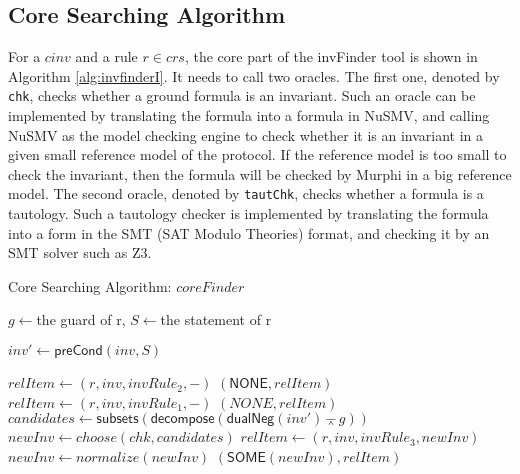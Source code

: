 \documentclass[conference]{IEEEtran}
\def \andc {\barwedge }
\begin{document}
{\subsection{Core Searching Algorithm}\label{sec:coresearchingAlgorithm}
\vspace{-5pt}
For a  $cinv$ and a rule $r \in crs$, the core part of the {\sf invFinder} tool is shown in Algorithm \ref{alg:invfinderI}. It needs to call two oracles. The first one, denoted by {\tt chk}, checks whether a ground formula is an invariant. Such an oracle can be implemented by translating the formula into a formula in NuSMV, and calling NuSMV as the model checking engine to check whether it is an invariant  in a given small reference model of the protocol. If  the reference model is too small to check the invariant, then the formula will be checked by Murphi in a big reference model.  The second oracle, denoted by {\tt tautChk}, checks whether a formula is a tautology. Such a tautology checker is implemented by translating the formula into a form in the SMT (SAT Modulo Theories) format, and checking it by an SMT solver such as Z3.

\vspace{-5pt}
\begin{algorithm}\label{alg:invFinder-I}

\caption{Core Searching Algorithm: $coreFinder$}\label{alg:invfinderI}



{
    $g\leftarrow $the guard of r, $S\leftarrow $the statement of r\;

    $inv'\leftarrow \mathsf{preCond}(inv, S)$\; \label{line:preCondComp}

    {
    $relItem\leftarrow (r, inv, invRule_2,-)$\;
    \Return $(\mathsf{NONE},  relItem )$\;
    }
    {
    $relItem\leftarrow (r, inv, invRule_1,-)$\;
    \Return $(NONE,  relItem )$\;
    }
    \Else
    {
    $candidates\leftarrow \mathsf{subsets}(\mathsf{decompose}(\mathsf{dualNeg}(inv')\andc g))$\;
    $newInv\leftarrow choose(chk,candidates)$\;
    $relItem\leftarrow (r, inv, invRule_3,newInv)$\;
    {
    $newInv \leftarrow  normalize(newInv)$\;%
    \Return $(\mathsf{SOME}(newInv),   relItem )$\;
    }
    }
}


\end{algorithm}}
\end{document}
